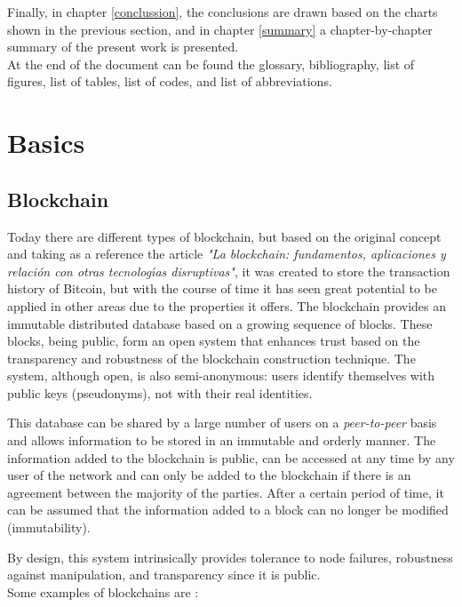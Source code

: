\documentclass[MSE,Master,english]{twbook}%
\begin{document}
Finally, in chapter \ref{conclussion}, the conclusions are drawn based on the charts shown in the previous section, and in chapter \ref{summary} a chapter-by-chapter summary of the present work is presented. \\

At the end of the document can be found the glossary, bibliography, list of figures, list of tables, list of codes, and list of abbreviations.
\clearpage

\chapter{Basics\label{basics}}
\section{Blockchain}
Today there are different types of blockchain, but based on the original concept and taking as a reference the article \emph{"La blockchain: fundamentos, aplicaciones y relaci{\'o}n con otras tecnolog{\'\i}as disruptivas"}\cite{blockchain}, it was created to store the transaction history of Bitcoin, but with the course of time it has seen great potential to be applied in other areas due to the properties it offers. The blockchain provides an immutable distributed database based on a growing sequence of blocks. These blocks, being public, form an open system that enhances trust based on the transparency and robustness of the blockchain construction technique. The system, although open, is also semi-anonymous: users identify themselves with public keys (pseudonyms), not with their real identities.

This database can be shared by a large number of users on a \emph{peer-to-peer} basis and allows information to be stored in an immutable and orderly manner. The information added to the blockchain is public, can be accessed at any time by any user of the network and can only be added to the blockchain if there is an agreement between the majority of the parties. After a certain period of time, it can be assumed that the information added to a block can no longer be modified (immutability).

By design, this system intrinsically provides tolerance to node failures, robustness against manipulation, and transparency since it is public. \\

Some examples of blockchains are \cite{blockchainDummies}:
\end{document}
